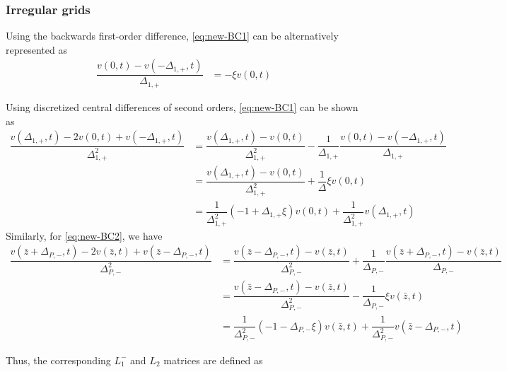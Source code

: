 \documentclass[11pt]{article}
\begin{document}
\subsubsection{Irregular grids}
Using the backwards first-order difference, \eqref{eq:new-BC1} can be alternatively represented as
\begin{align}
\dfrac{v(0, t) - v(-\Delta_{1, +}, t)}{\Delta_{1, +}} &= - \xi v(0,t)
\end{align}

Using discretized central differences of second orders, \eqref{eq:new-BC1} can be shown as
\begin{align}
\dfrac{v (\Delta_{1, +}, t) - 2 v(0, t) + v(-\Delta_{1, +}, t)}{\Delta_{1, +}^2} &=   \dfrac{v(\Delta_{1, +}, t) - v(0, t)}{\Delta_{1, +}^2} - \dfrac{1}{\Delta_{1, +}}\dfrac{v (0, t) - v(-\Delta_{1, +}, t) }{\Delta_{1, +}}  \\
&= \dfrac{v(\Delta_{1, +}, t) - v(0, t)}{\Delta_{1, +}^2} + \dfrac{1}{\Delta} \xi v(0, t)  \\ 
&= \dfrac{1}{\Delta_{1, +}^2}  (- 1 + \Delta_{1, +} \xi) v(0,t)  + \dfrac{1}{\Delta_{1, +}^2}  v(\Delta_{1, +}, t)  
\end{align}
Similarly, for \eqref{eq:new-BC2}, we have
\begin{align}
\dfrac{v (\bar{z} + \Delta_{P,-}, t) - 2 v(\bar{z} , t) + v(\bar{z} -\Delta_{P,-}, t)}{\Delta_{P,-}^2} &=   \dfrac{v(\bar{z} - \Delta_{P,-}, t) - v(\bar{z}, t)}{\Delta_{P,-}^2} + \dfrac{1}{\Delta_{P,-}}\dfrac{ v(\bar{z}+\Delta_{P,-}, t) - v (\bar{z}, t) }{\Delta_{P,-}}  \\
&= \dfrac{v(\bar{z} - \Delta_{P,-}, t) - v(\bar{z}, t)}{\Delta_{P,-}^2}  - \dfrac{1}{\Delta_{P,-}} \xi v(\bar{z}, t)  \\ 
&= \dfrac{1}{\Delta_{P,-}^2}  (- 1 - \Delta_{P,-} \xi) v(\bar{z},t)  + \dfrac{1}{\Delta_{P,-}^2}  v(\bar{z} - \Delta_{P,-}, t)  
\end{align}

Thus, the corresponding $L_1^{-}$ and $L_2$ matrices are defined as 
\end{document}
